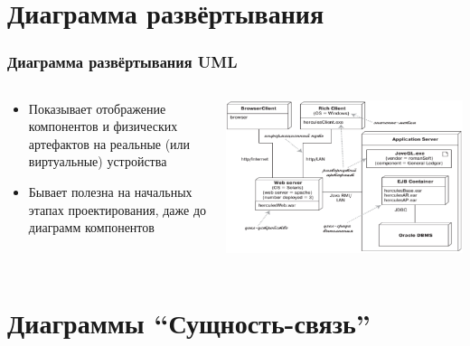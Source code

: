 \documentclass{../cscslides}
\begin{document}
    \section{Диаграмма развёртывания}
    
    \begin{frame}
        \frametitle{Диаграмма развёртывания UML}
        \begin{columns}
            \begin{column}{0.5\textwidth}
                \begin{itemize}
                    \item Показывает отображение компонентов и физических артефактов на реальные (или виртуальные) устройства
                    \item Бывает полезна на начальных этапах проектирования, даже до диаграмм компонентов
                \end{itemize}
            \end{column}
            \begin{column}{0.5\textwidth}
                \begin{center}
                    \includegraphics[width=\textwidth]{deploymentDiagram.png}
                \end{center}
            \end{column}
        \end{columns}
    \end{frame}

    \section{Диаграммы ``Сущность-связь''}
\end{document}
